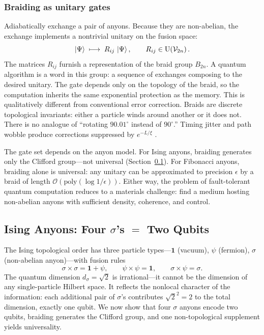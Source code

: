 \subsubsection*{Braiding as unitary gates}

Adiabatically exchange a pair of anyons.  Because they are non-abelian, the exchange implements a nontrivial unitary on the fusion space:
\begin{equation}
  \left|\Psi\right\rangle \;\longmapsto\; R_{ij}\,\left|\Psi\right\rangle,
  \qquad R_{ij} \in \mathrm{U}\!\left(\mathcal{V}_{2n}\right).
  \label{eq:braid-gate}
\end{equation}
The matrices $R_{ij}$ furnish a representation of the braid group $B_{2n}$.  A quantum algorithm is a word in this group: a sequence of exchanges composing to the desired unitary.  The gate depends only on the topology of the braid, so the computation inherits the same exponential protection as the memory.  This is qualitatively different from conventional error correction.  Braids are discrete topological invariants: either a particle winds around another or it does not.  There is no analogue of ``rotating $90.01^\circ$ instead of $90^\circ$.''  Timing jitter and path wobble produce corrections suppressed by $e^{-L/\xi}$
\cite{Kitaev2003FaultTolerant, NayakSimonSternFreedmanDasSarma2008NonabelianAnyons}.

The gate set depends on the anyon model.  For Ising anyons, braiding generates only the Clifford group---not universal (Section~\ref{subsec:ising-gates}).  For Fibonacci anyons, braiding alone is universal: any unitary can be approximated to precision $\epsilon$ by a braid of length $\mathcal{O}(\mathrm{poly}(\log 1/\epsilon))$.  Either way, the problem of fault-tolerant quantum computation reduces to a materials challenge: find a medium hosting non-abelian anyons with sufficient density, coherence, and control.

\subsection{Ising Anyons: Four $\sigma$'s $=$ Two Qubits}
\label{subsec:ising-gates}

The Ising topological order has three particle types---$\mathbf{1}$ (vacuum), $\psi$ (fermion), $\sigma$ (non-abelian anyon)---with fusion rules
\begin{equation}
  \sigma \times \sigma = \mathbf{1} + \psi, \qquad
  \psi \times \psi = \mathbf{1}, \qquad
  \sigma \times \psi = \sigma.
  \label{eq:ising-fusion-rules}
\end{equation}
The quantum dimension $d_\sigma = \sqrt{2}$ is irrational---it cannot be the dimension of any single-particle Hilbert space.  It reflects the nonlocal character of the information: each additional pair of $\sigma$'s contributes $\sqrt{2}^2 = 2$ to the total dimension, exactly one qubit.  We now show that four $\sigma$ anyons encode two qubits, braiding generates the Clifford group, and one non-topological supplement yields universality.

